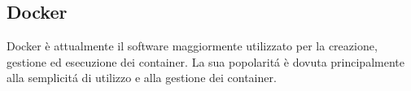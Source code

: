 \subsection{Docker}
\cite{docker}Docker è attualmente il software maggiormente utilizzato per la creazione, gestione ed esecuzione dei container. La sua popolaritá è dovuta principalmente alla semplicitá di utilizzo e alla gestione dei container.




